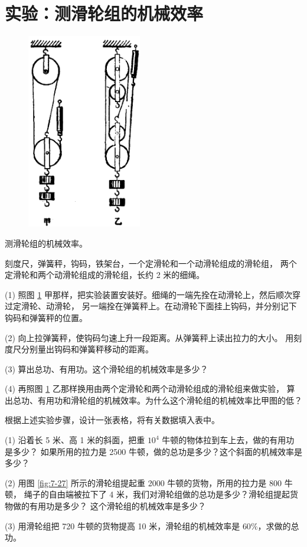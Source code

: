 \section{实验：测滑轮组的机械效率}\label{sec:8-6}

\begin{figure}
    \centering
    \includegraphics[width=5cm]{../pic/czwl1-ch8-9}
    \caption{}\label{fig:8-9}
\end{figure}

 测滑轮组的机械效率。

 刻度尺，弹簧秤，钩码，铁架台，一个定滑轮和一个动滑轮组成的滑轮组，
两个定滑轮和两个动滑轮组成的滑轮组，长约 2 米的细绳。


(1) 照图 \ref{fig:8-9} 甲那样，把实验装置安装好。细绳的一端先拴在动滑轮上，然后顺次穿过定滑轮、动滑轮，
另一端拴在弹簧秤上。在动滑轮下面挂上钩码，并分别记下钩码和弹簧秤的位置。

(2) 向上拉弹簧秤，使钩码匀速上升一段距离。从弹簧秤上读出拉力的大小。
用刻度尺分别量出钩码和弹簧秤移动的距离。

(3) 算出总功、有用功。这个滑轮组的机械效率是多少？

(4) 再照图 \ref{fig:8-9} 乙那样换用由两个定滑轮和两个动滑轮组成的滑轮组来做实验，
算出总功、有用功和滑轮组的机械效率。为什么这个滑轮组的机械效率比甲图的低？

根据上述实验步骤，设计一张表格，将有关数据填入表中。


\lianxi

(1) 沿着长 5 米、高 1 米的斜面，把重 $10^4$ 牛顿的物体拉到车上去，做的有用功是多少？
如果所用的拉力是 2500 牛顿，做的总功是多少？这个斜面的机械效率是多少？

(2) 用图 \ref{fig:7-27} 所示的滑轮组提起重 2000 牛顿的货物，所用的拉力是 800 牛顿，
绳子的自由端被拉下了 4 米，我们对滑轮组做的总功是多少？滑轮组提起货物做的有用功是多少？
这个滑轮组的机械效率是多少？

(3) 用滑轮组把 720 牛顿的货物提高 10 米，滑轮组的机械效率是 $60\%$，求做的总功。

